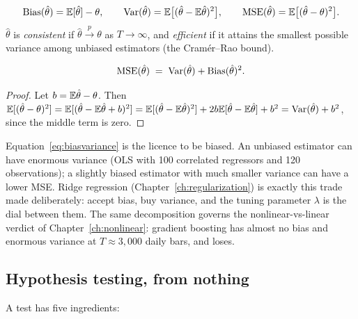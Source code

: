 \begin{definition}
\[
  \operatorname{Bias}(\hat\theta)=\mathbb{E}[\hat\theta]-\theta,\qquad
  \operatorname{Var}(\hat\theta)=\mathbb{E}\bigl[(\hat\theta-\mathbb{E}\hat\theta)^2\bigr],\qquad
  \operatorname{MSE}(\hat\theta)=\mathbb{E}\bigl[(\hat\theta-\theta)^2\bigr].
\]
$\hat\theta$ is \emph{consistent} if $\hat\theta\xrightarrow{\ p\ }\theta$ as
$T\to\infty$, and \emph{efficient} if it attains the smallest possible variance among
unbiased estimators (the Cramér--Rao bound).
\end{definition}

\begin{proposition}
\begin{equation}
  \operatorname{MSE}(\hat\theta) \;=\; \operatorname{Var}(\hat\theta) + \operatorname{Bias}(\hat\theta)^2 .
  \label{eq:biasvariance}
\end{equation}
\end{proposition}
\begin{proof}
Let $b=\mathbb{E}\hat\theta-\theta$. Then
$\mathbb{E}[(\hat\theta-\theta)^2]=\mathbb{E}[(\hat\theta-\mathbb{E}\hat\theta + b)^2]
=\mathbb{E}[(\hat\theta-\mathbb{E}\hat\theta)^2] + 2b\mathbb{E}[\hat\theta-\mathbb{E}\hat\theta] + b^2
=\operatorname{Var}(\hat\theta)+b^2$, since the middle term is zero.
\end{proof}

\begin{intuition}
Equation~\eqref{eq:biasvariance} is the licence to be biased. An unbiased estimator can
have enormous variance (OLS with 100 correlated regressors and 120 observations); a
slightly biased estimator with much smaller variance can have a lower MSE. Ridge
regression (Chapter~\ref{ch:regularization}) is exactly this trade made deliberately:
accept bias, buy variance, and the tuning parameter $\lambda$ is the dial between them.
The same decomposition governs the nonlinear-vs-linear verdict of
Chapter~\ref{ch:nonlinear}: gradient boosting has almost no bias and enormous variance
at $T\approx3{,}000$ daily bars, and loses.
\end{intuition}

\subsection{Hypothesis testing, from nothing}
\label{sec:prob:testing}

A test has five ingredients:

